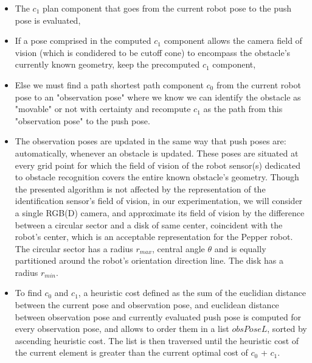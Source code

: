 \begin{itemize}
  \item The $c_{1}$ plan component that goes from the current robot pose to the push pose is evaluated,
  \item If a pose comprised in the computed $c_{1}$ component allows the camera field of vision (which is condidered to be cutoff cone) to encompass the obstacle's currently known geometry, keep the precomputed $c_{1}$ component,
  \item Else we must find a path shortest path component $c_{0}$ from the current robot pose to an "observation pose" where we know we can identify the obstacle as "movable" or not with certainty and recompute $c_{1}$ as the path from this "observation pose" to the push pose.
  \item The observation poses are updated in the same way that push poses are: automatically, whenever an obstacle is updated. These poses are situated at every grid point for which the field of vision of the robot sensor(s) dedicated to obstacle recognition covers the entire known obstacle's geometry. Though the presented algorithm is not affected by the representation of the identification sensor's field of vision, in our experimentation, we will consider a single RGB(D) camera, and approximate its field of vision by the difference between a circular sector and a disk of same center, coincident with the robot's center, which is an acceptable representation for the Pepper robot. The circular sector has a radius $r_{max}$, central angle $\theta$ and is equally partitioned around the robot's orientation direction line. The disk has a radius $r_{min}$.
  \item To find $c_{0}$ and $c_{1}$, a heuristic cost defined as the sum of the euclidian distance between the current pose and observation pose, and euclidean distance between observation pose and currently evaluated push pose is computed for every observation pose, and allows to order them in a list $obsPoseL$, sorted by ascending heuristic cost. The list is then traversed until the heuristic cost of the current element is greater than the current optimal cost of $c_{0}$ + $c_{1}$.
\end{itemize}







